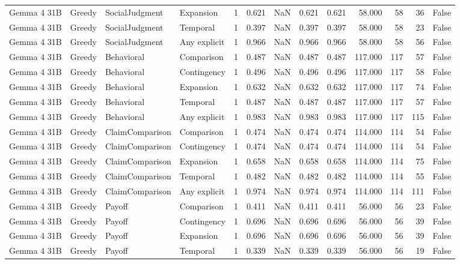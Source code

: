 \begin{tabular}{llllrrrrrrrrr}
Gemma 4 31B & Greedy & SocialJudgment & Expansion & 1 & 0.621 & NaN & 0.621 & 0.621 & 58.000 & 58 & 36 & False \\
Gemma 4 31B & Greedy & SocialJudgment & Temporal & 1 & 0.397 & NaN & 0.397 & 0.397 & 58.000 & 58 & 23 & False \\
Gemma 4 31B & Greedy & SocialJudgment & Any explicit & 1 & 0.966 & NaN & 0.966 & 0.966 & 58.000 & 58 & 56 & False \\
Gemma 4 31B & Greedy & Behavioral & Comparison & 1 & 0.487 & NaN & 0.487 & 0.487 & 117.000 & 117 & 57 & False \\
Gemma 4 31B & Greedy & Behavioral & Contingency & 1 & 0.496 & NaN & 0.496 & 0.496 & 117.000 & 117 & 58 & False \\
Gemma 4 31B & Greedy & Behavioral & Expansion & 1 & 0.632 & NaN & 0.632 & 0.632 & 117.000 & 117 & 74 & False \\
Gemma 4 31B & Greedy & Behavioral & Temporal & 1 & 0.487 & NaN & 0.487 & 0.487 & 117.000 & 117 & 57 & False \\
Gemma 4 31B & Greedy & Behavioral & Any explicit & 1 & 0.983 & NaN & 0.983 & 0.983 & 117.000 & 117 & 115 & False \\
Gemma 4 31B & Greedy & ClaimComparison & Comparison & 1 & 0.474 & NaN & 0.474 & 0.474 & 114.000 & 114 & 54 & False \\
Gemma 4 31B & Greedy & ClaimComparison & Contingency & 1 & 0.474 & NaN & 0.474 & 0.474 & 114.000 & 114 & 54 & False \\
Gemma 4 31B & Greedy & ClaimComparison & Expansion & 1 & 0.658 & NaN & 0.658 & 0.658 & 114.000 & 114 & 75 & False \\
Gemma 4 31B & Greedy & ClaimComparison & Temporal & 1 & 0.482 & NaN & 0.482 & 0.482 & 114.000 & 114 & 55 & False \\
Gemma 4 31B & Greedy & ClaimComparison & Any explicit & 1 & 0.974 & NaN & 0.974 & 0.974 & 114.000 & 114 & 111 & False \\
Gemma 4 31B & Greedy & Payoff & Comparison & 1 & 0.411 & NaN & 0.411 & 0.411 & 56.000 & 56 & 23 & False \\
Gemma 4 31B & Greedy & Payoff & Contingency & 1 & 0.696 & NaN & 0.696 & 0.696 & 56.000 & 56 & 39 & False \\
Gemma 4 31B & Greedy & Payoff & Expansion & 1 & 0.696 & NaN & 0.696 & 0.696 & 56.000 & 56 & 39 & False \\
Gemma 4 31B & Greedy & Payoff & Temporal & 1 & 0.339 & NaN & 0.339 & 0.339 & 56.000 & 56 & 19 & False \\

\end{tabular}
